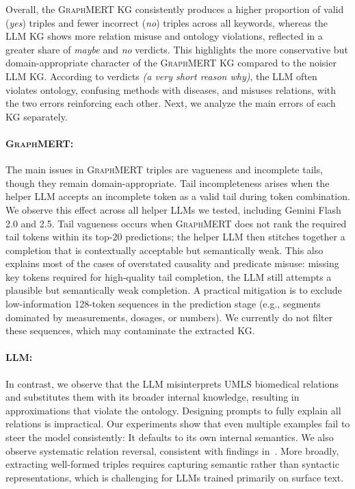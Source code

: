 \documentclass[10pt]{article}
\newcommand{\ours}{\textsc{GraphMERT}\xspace}
\begin{document}
Overall, the \ours KG consistently produces a higher proportion of valid (\textit{yes}) triples and fewer incorrect (\textit{no}) triples across all keywords, whereas the LLM KG shows more relation misuse and ontology violations, reflected in a greater share of \textit{maybe} and \textit{no} verdicts. This highlights the more conservative but domain-appropriate character of the \ours KG compared to the noisier LLM KG. According to verdicts \textit{(a very short reason why)}, the LLM often violates ontology, confusing methods with diseases, and misuses relations, with the two errors reinforcing each other. Next, we analyze the main errors of each KG separately.

\paragraph{\ours:} The main issues in \ours triples are vagueness and incomplete tails, though they remain domain-appropriate. Tail incompleteness arises when the helper LLM accepts an incomplete token as a valid tail during token combination. We observe this effect across all helper LLMs we tested, including Gemini Flash 2.0 and 2.5. Tail vagueness occurs when \ours does not rank the required tail tokens within its top-20 predictions; the helper LLM then stitches together a completion that is contextually acceptable but semantically weak. This also explains most of the cases of overstated causality and predicate misuse: missing key tokens required for high-quality tail completion, the LLM still attempts a plausible but semantically weak completion. A practical mitigation is to exclude low-information 128-token sequences in the prediction stage (e.g., segments dominated by measurements, dosages, or numbers). We currently do not filter these sequences, which may contaminate the extracted KG.

\paragraph{LLM:} In contrast, we observe that the LLM misinterprets UMLS biomedical relations and substitutes them with its broader internal knowledge, resulting in approximations that violate the ontology. Designing prompts to fully explain all relations is impractical. Our experiments show that even multiple examples fail to steer the model consistently: It defaults to its own internal semantics. We also observe systematic relation reversal, consistent with findings in~\cite{2024reversalcurse}. More broadly, extracting well-formed triples requires capturing semantic rather than syntactic representations, which is challenging for LLMs trained primarily on surface text.
\end{document}
